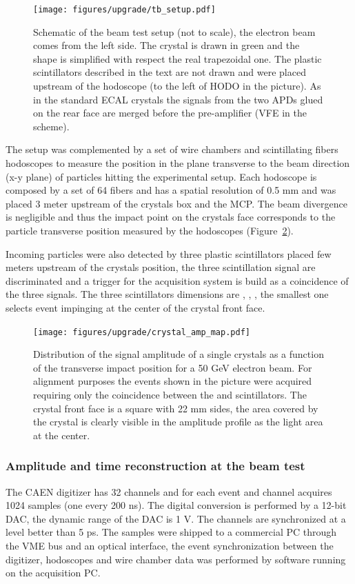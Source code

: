 \begin{figure}[h!]
  \centering
  \texttt{[image: figures/upgrade/tb\_setup.pdf]}
  \caption{Schematic of the beam test setup (not to scale), the electron beam comes from the left side.
    The \PbWO crystal is drawn in green and the shape is simplified with
    respect the real trapezoidal one. The plastic scintillators described in the text are not drawn and were placed
    upstream of the hodoscope (to the left of HODO in the picture). As in the standard ECAL crystals the signals from the two APDs
    glued on the rear face are merged before the pre-amplifier (VFE in the scheme).}
  \label{fig:tb_setup}
\end{figure}
  
The setup was complemented by a set of wire chambers and scintillating fibers hodoscopes to measure the position in the plane
transverse to the beam direction (x-y plane) of particles hitting the experimental setup.
Each hodoscope is composed by a set of 64 fibers and has a spatial resolution of 0.5 mm and was placed
3 meter upstream of the crystals box and the MCP. The beam divergence is negligible and thus the impact point on the crystals
face corresponds to the particle transverse position measured by the hodoscopes (Figure~\ref{fig:crystal_amp_map}).

Incoming particles were also detected by three plastic scintillators placed few meters upstream of the crystals position, the
three scintillation signal are discriminated and a trigger for the acquisition system is build as a coincidence of the three signals.
The three scintillators dimensions are \sixbysix, \threebythree, \onebyone, the smallest one selects event impinging at the
center of the \twobytwo crystal front face.

\begin{figure}[h!]
  \centering
  \texttt{[image: figures/upgrade/crystal\_amp\_map.pdf]}
  \caption{Distribution of the signal amplitude of a single crystals as a function of the transverse impact position for
    a 50 GeV electron beam. For alignment purposes the events shown in the picture
    were acquired requiring only the coincidence between the \sixbysix and \threebythree scintillators.
    The crystal front face is a square with 22 mm sides, the area covered by the crystal is clearly visible in the amplitude
    profile as the light area at the center.}
  \label{fig:crystal_amp_map}
\end{figure}

\subsubsection{Amplitude and time reconstruction at the beam test}
The CAEN digitizer has 32 channels and for each event and channel acquires 1024 samples (one every 200 ns). The
digital conversion is performed by a 12-bit DAC, the dynamic range of the DAC is 1 V.
The channels are synchronized at a level better than 5 ps.
The samples were shipped to a commercial PC through the VME bus and an optical interface, the event
synchronization between the digitizer, hodoscopes and wire chamber data was performed by software running on the
acquisition PC.

